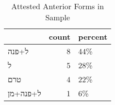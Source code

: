 \begin{table}[htbp!]
\centering
\caption{Attested Anterior Forms in Sample}
\label{table:ant_front}
\begin{tabular}{lrl}
\toprule
{} &  count & percent \\
\midrule
\texthebrew{ל+פנה}    &      8 &     44\% \\
\texthebrew{ל}        &      5 &     28\% \\
\texthebrew{טרם}      &      4 &     22\% \\
\texthebrew{ל+פנה+מן} &      1 &      6\% \\
\bottomrule
\end{tabular}
\end{table}
